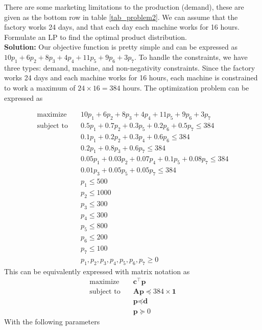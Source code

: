 \documentclass[11pt]{article}
\begin{document}
There are some marketing limitations to the production (demand), these are given as the bottom row in table \ref{tab_problem2}.
We can assume that the factory works 24 days, and that each day each machine works for
16 hours.
Formulate an LP to find the optimal product distribution.
\\
\textbf{Solution: }
Our objective function is pretty simple and can be expressed as $10 p_1 + 6 p_2 + 8 p_3 + 4 p_4 + 11 p_5 + 9 p_6 + 3 p_7$.
To handle the constraints, we have three types: demand, machine, and non-negativity constraints.
Since the factory works 24 days and each machine works for 16 hours, each machine is constrained to work a maximum of $24 \times 16 = 384$ hours.
The optimization problem can be expressed as

\begin{align*}
  \text{maximize} & \quad 10 p_1 + 6 p_2 + 8 p_3 + 4 p_4 + 11 p_5 + 9 p_6 + 3 p_7 \\
  \text{subject to} & \quad 0.5 p_1 + 0.7 p_2 + 0.3 p_5 + 0.2 p_6 + 0.5 p_7 \leq 384 \\
  & \quad 0.1 p_1 + 0.2 p_2 + 0.3 p_4 + 0.6 p_6 \leq 384 \\
  & \quad 0.2 p_1 + 0.8 p_3 + 0.6 p_7 \leq 384 \\
  & \quad 0.05 p_1 + 0.03 p_2 + 0.07 p_4 + 0.1 p_5 + 0.08 p_7 \leq 384 \\
  & \quad 0.01 p_3 + 0.05 p_5 + 0.05 p_7 \leq 384 \\
  & \quad p_1 \leq 500 \\
  & \quad p_2 \leq 1000 \\
  & \quad p_3 \leq 300 \\
  & \quad p_4 \leq 300 \\
  & \quad p_5 \leq 800 \\
  & \quad p_6 \leq 200 \\
  & \quad p_7 \leq 100 \\
  & \quad p_1, p_2, p_3, p_4, p_5, p_6, p_7 \geq 0
\end{align*}
This can be equivalently expressed with matrix notation as 
\begin{align*}
  \text{maximize} & \quad \textbf{c}^\top \textbf{p} \\
  \text{subject to} & \quad \textbf{A} \textbf{p} \preceq 384 \times \textbf{1} \\
  & \quad \textbf{p} \preceq \textbf{d} \\
  & \quad \textbf{p} \succeq 0
\end{align*}
With the following parameters
\end{document}
